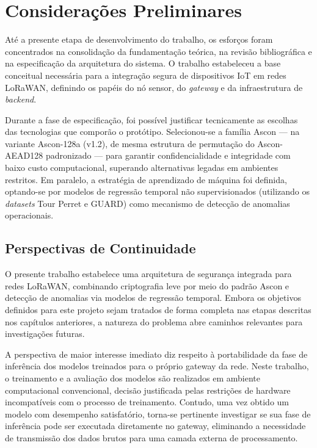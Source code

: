 \chapter{Considerações Preliminares} \label{cap:consideracoes}

Até a presente etapa de desenvolvimento do trabalho, os esforços foram concentrados na consolidação da fundamentação teórica, na revisão bibliográfica e na especificação da arquitetura do sistema. O trabalho estabeleceu a base conceitual necessária para a integração segura de dispositivos IoT em redes LoRaWAN, definindo os papéis do nó sensor, do \textit{gateway} e da infraestrutura de \textit{backend}. 

Durante a fase de especificação, foi possível justificar tecnicamente as escolhas das tecnologias que comporão o protótipo. Selecionou-se a família Ascon — na variante Ascon-128a (v1.2), de mesma estrutura de permutação do Ascon-AEAD128 padronizado — para garantir confidencialidade e integridade com baixo custo computacional, superando alternativas legadas em ambientes restritos. Em paralelo, a estratégia de aprendizado de máquina foi definida, optando-se por modelos de regressão temporal não supervisionados (utilizando os \textit{datasets} Tour Perret e GUARD) como mecanismo de detecção de anomalias operacionais.

\section{Perspectivas de Continuidade}

O presente trabalho estabelece uma arquitetura de segurança integrada para 
redes LoRaWAN, combinando criptografia leve por meio do padrão Ascon e 
detecção de anomalias via modelos de regressão temporal. Embora os objetivos 
definidos para este projeto sejam tratados de forma completa nas etapas 
descritas nos capítulos anteriores, a natureza do problema abre caminhos 
relevantes para investigações futuras.

A perspectiva de maior interesse imediato diz respeito à portabilidade da 
fase de inferência dos modelos treinados para o próprio gateway da rede. 
Neste trabalho, o treinamento e a avaliação dos modelos são realizados em 
ambiente computacional convencional, decisão justificada pelas restrições de 
hardware incompatíveis com o processo de treinamento. Contudo, uma vez 
obtido um modelo com desempenho satisfatório, torna-se pertinente investigar 
se sua fase de inferência pode ser executada diretamente no gateway, 
eliminando a necessidade de transmissão dos dados brutos para uma camada 
externa de processamento.

